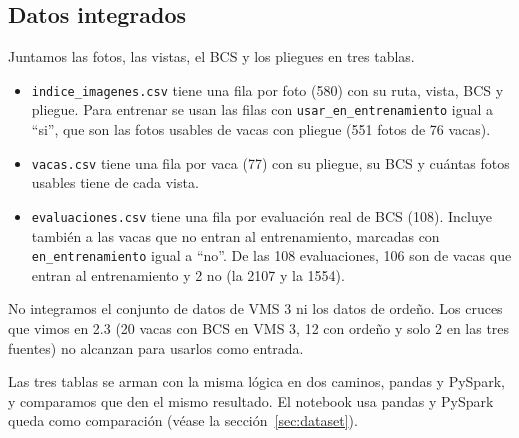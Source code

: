 \subsection{Datos integrados}

Juntamos las fotos, las vistas, el BCS y los pliegues en tres tablas.

\begin{itemize}
  \item \nolinkurl{indice_imagenes.csv} tiene una fila por foto (580) con su ruta, vista, BCS y pliegue. Para entrenar se usan las filas con \texttt{usar\_en\_entrenamiento} igual a ``si'', que son las fotos usables de vacas con pliegue (551 fotos de 76 vacas).
  \item \nolinkurl{vacas.csv} tiene una fila por vaca (77) con su pliegue, su BCS y cuántas fotos usables tiene de cada vista.
  \item \nolinkurl{evaluaciones.csv} tiene una fila por evaluación real de BCS (108). Incluye también a las vacas que no entran al entrenamiento, marcadas con \texttt{en\_entrenamiento} igual a ``no''. De las 108 evaluaciones, 106 son de vacas que entran al entrenamiento y 2 no (la 2107 y la 1554).
\end{itemize}

No integramos el conjunto de datos de VMS 3 ni los datos de ordeño. Los cruces que vimos en 2.3 (20 vacas con BCS en VMS 3, 12 con ordeño y solo 2 en las tres fuentes) no alcanzan para usarlos como entrada.

Las tres tablas se arman con la misma lógica en dos caminos, pandas y PySpark, y comparamos que den el mismo resultado. El notebook usa pandas y PySpark queda como comparación (véase la sección~\ref{sec:dataset}).
